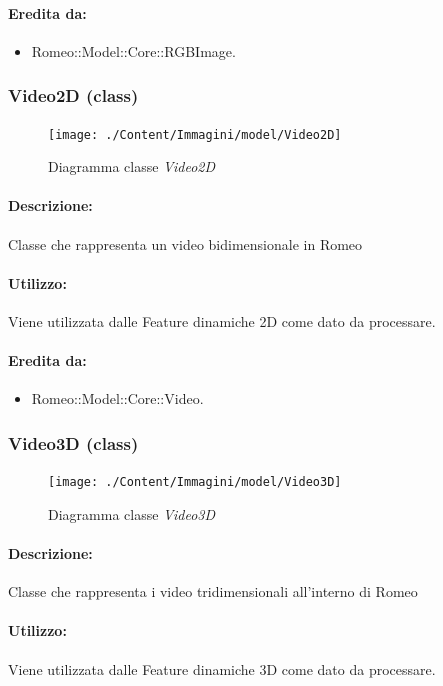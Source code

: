 	\paragraph{Eredita da:}
		\begin{itemize}
			\item Romeo::Model::Core::RGBImage.
		\end{itemize}
	\subsubsection{Video2D (class)}
	\begin{figure}[!h]
		\centering
		\texttt{[image: ./Content/Immagini/model/Video2D]}
		\caption{Diagramma classe \textsl{Video2D}}
	\end{figure}
	\paragraph{Descrizione:} Classe che rappresenta un video bidimensionale in Romeo\g{}
	\paragraph{Utilizzo:} Viene utilizzata dalle Feature\g{} dinamiche 2D come dato da processare.
	\paragraph{Eredita da:}
		\begin{itemize}
			\item Romeo::Model::Core::Video.
		\end{itemize}
	\subsubsection{Video3D (class)}
	\begin{figure}[!h]
		\centering
		\texttt{[image: ./Content/Immagini/model/Video3D]}
		\caption{Diagramma classe \textsl{Video3D}}
	\end{figure}
	\paragraph{Descrizione:} Classe che rappresenta i video tridimensionali all'interno di Romeo\g{}
	\paragraph{Utilizzo:} Viene utilizzata dalle Feature\g{} dinamiche 3D come dato da processare.
